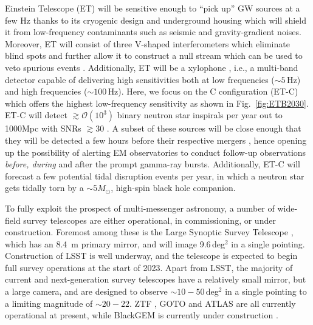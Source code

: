 \documentclass{aa}
\begin{document}
Einstein Telescope (ET) will be sensitive enough to ``pick up'' GW sources at a few Hz thanks to
its cryogenic design and underground housing which will shield it from low-frequency contaminants such as seismic and gravity-gradient noises. Moreover, ET will consist of three
 V-shaped interferometers which eliminate blind spots and further allow it to construct a null
 stream \citep{Sathyaprakash:2012jk} which can be used to veto spurious events \citep{Wen:2005ui}. 
 Additionally, ET will be a xylophone \citep{Hild:2009ns}, i.e., a multi-band detector capable of delivering high sensitivities both at low frequencies ($\sim 5\,$Hz) and high frequencies ($\sim 100\,$Hz). 
 Here, we focus on the C configuration (ET-C) which offers the highest low-frequency sensitivity as shown in Fig.~\ref{fig:ETB2030}.
 ET-C will detect $\gtrsim\mathcal{O}(10^3)$ binary neutron star inspirals per year out to 1000Mpc with SNRs $\gtrsim 30 $ \citep{Akcay18}. A subset of these sources will be close enough that they will be detected a few hours
before their respective mergers \citep{Akcay18}, hence opening up the possibility of alerting EM
observatories to conduct follow-up observations \emph{before, during} and after the prompt gamma-ray bursts. Additionally, ET-C will forecast a few potential tidal disruption events per year, in which
a neutron star gets tidally torn by a $\sim 5 M_\odot$, high-spin black hole companion.


To fully exploit the prospect of multi-messenger astronomy, a number of wide-field survey telescopes are either operational, in commissioning, or under construction. Foremost among these is the Large Synoptic Survey Telescope \citep[LSST;][]{LSSTbook}, which has an 8.4~m primary mirror, and will image 9.6\,deg$^2$ in a single pointing. Construction of LSST is well underway, and the telescope is expected to begin full survey operations at the start of 2023. Apart from LSST, the majority of current and next-generation survey telescopes have a relatively small mirror, but a large camera, and are designed to observe $\sim10 - 50\,$deg$^2$ in a single pointing to a limiting magnitude of $\sim20-22$. ZTF \citep{ZTF}, GOTO \citep{GOTO} and ATLAS \citep{ATLAS} are all currently operational at present, while BlackGEM is currently under construction \citep{BlackGEM}.
\end{document}

